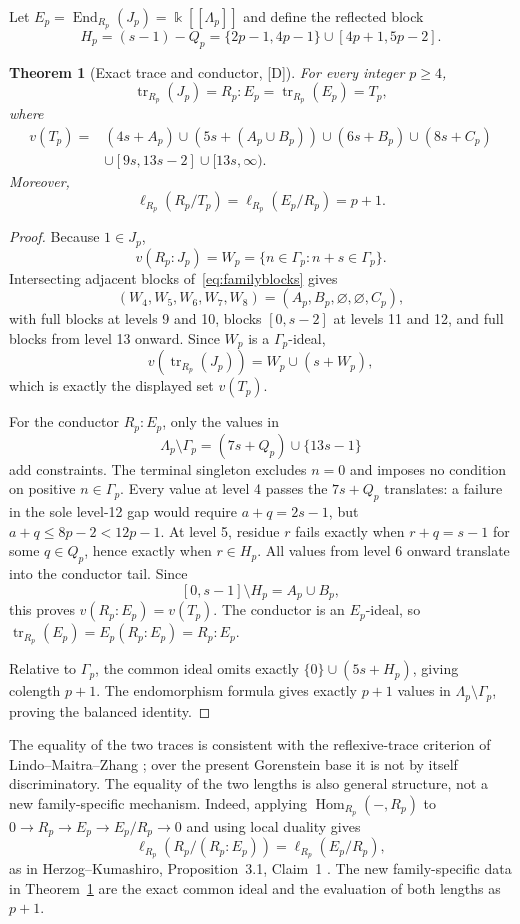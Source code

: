 \documentclass[11pt]{article}
\newtheorem{theorem}{Theorem}[section]
\theoremstyle{definition}
\theoremstyle{remark}
\newcommand{\kfield}{\Bbbk}
\begin{document}
Let $E_p=\operatorname{End}_{R_p}(J_p)=\kfield[[\Lambda_p]]$ and define the reflected block
\[
H_p=(s-1)-Q_p=\{2p-1,4p-1\}\cup[4p+1,5p-2].
\]

\begin{theorem}[Exact trace and conductor, {[D]}]\label{thm:trace}
For every integer $p\ge4$,
\[
\operatorname{tr}_{R_p}(J_p)=R_p:E_p=\operatorname{tr}_{R_p}(E_p)=T_p,
\]
where
\begin{align*}
v(T_p)={}&(4s+A_p)\cup(5s+(A_p\cup B_p))\cup(6s+B_p)\cup(8s+C_p)\\
&\cup[9s,13s-2]\cup[13s,\infty).
\end{align*}
Moreover,
\[
\ell_{R_p}(R_p/T_p)=\ell_{R_p}(E_p/R_p)=p+1.
\]
\end{theorem}
\begin{proof}
Because $1\in J_p$,
\[
v(R_p:J_p)=W_p=\{n\in\Gamma_p:n+s\in\Gamma_p\}.
\]
Intersecting adjacent blocks of~\eqref{eq:familyblocks} gives
\[
(W_4,W_5,W_6,W_7,W_8)=(A_p,B_p,\varnothing,\varnothing,C_p),
\]
with full blocks at levels 9 and 10, blocks $[0,s-2]$ at levels 11 and 12, and full blocks from
level 13 onward. Since $W_p$ is a $\Gamma_p$-ideal,
\[
v(\operatorname{tr}_{R_p}(J_p))=W_p\cup(s+W_p),
\]
which is exactly the displayed set $v(T_p)$.

For the conductor $R_p:E_p$, only the values in
\[
\Lambda_p\setminus\Gamma_p=(7s+Q_p)\cup\{13s-1\}
\]
add constraints. The terminal singleton excludes $n=0$ and imposes no condition on positive
$n\in\Gamma_p$. Every value at level 4 passes the $7s+Q_p$ translates: a failure in the sole
level-12 gap would require $a+q=2s-1$, but $a+q\le8p-2<12p-1$. At level 5, residue $r$ fails
exactly when $r+q=s-1$ for some $q\in Q_p$, hence exactly when $r\in H_p$. All values from level 6
onward translate into the conductor tail. Since
\[
[0,s-1]\setminus H_p=A_p\cup B_p,
\]
this proves $v(R_p:E_p)=v(T_p)$. The conductor is an $E_p$-ideal, so
$\operatorname{tr}_{R_p}(E_p)=E_p(R_p:E_p)=R_p:E_p$.

Relative to $\Gamma_p$, the common ideal omits exactly $\{0\}\cup(5s+H_p)$, giving colength
$p+1$. The endomorphism formula gives exactly $p+1$ values in
$\Lambda_p\setminus\Gamma_p$, proving the balanced identity.
\end{proof}

The equality of the two traces is consistent with the reflexive-trace criterion of
Lindo--Maitra--Zhang \cite{LindoMaitraZhang2026}; over the present Gorenstein base it is not by
itself discriminatory. The equality of the two lengths is also general structure, not a new
family-specific mechanism. Indeed, applying $\operatorname{Hom}_{R_p}(-,R_p)$ to
$0\to R_p\to E_p\to E_p/R_p\to0$ and using local duality gives
\[
\ell_{R_p}(R_p/(R_p:E_p))=\ell_{R_p}(E_p/R_p),
\]
as in Herzog--Kumashiro, Proposition~3.1, Claim~1 \cite{HerzogKumashiro2022}. The new
family-specific data in Theorem~\ref{thm:trace} are the exact common ideal and the evaluation of
both lengths as $p+1$.
\end{document}
